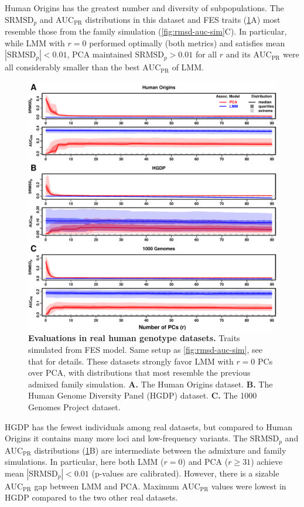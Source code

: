 \documentclass[11pt]{article}
\newcommand{\rmsd}{\text{SRMSD}_p}
\newcommand{\auc}{\text{AUC}_\text{PR}}
\begin{document}
Human Origins has the greatest number and diversity of subpopulations.
The $\rmsd$ and $\auc$ distributions in this dataset and FES traits (\cref{fig:rmsd-auc-real}A) most resemble those from the family simulation (\cref{fig:rmsd-auc-sim}C).
In particular, while LMM with $r=0$ performed optimally (both metrics) and satisfies mean $|\rmsd| < 0.01$, PCA maintained $\rmsd > 0.01$ for all $r$ and its $\auc$ were all considerably smaller than the best $\auc$ of LMM.

\begin{figure}[bp!]
  \centering
  \includegraphics[width=\textwidth,height=\textheight,keepaspectratio]{fes/rmsd-auc-real.pdf}
  \caption{
    {\small 
      {\bf Evaluations in real human genotype datasets.}
      Traits simulated from FES model.
      Same setup as \cref{fig:rmsd-auc-sim}, see that for details.
      These datasets strongly favor LMM with $r = 0$ PCs over PCA, with distributions that most resemble the previous admixed family simulation.
      \textbf{A.}
      The Human Origins dataset.
      \textbf{B.}
      The Human Genome Diversity Panel (HGDP) dataset.
      \textbf{C.}
      The 1000 Genomes Project dataset.
    }
  }
  \label{fig:rmsd-auc-real}
\end{figure}

HGDP has the fewest individuals among real datasets, but compared to Human Origins it contains many more loci and low-frequency variants.
The $\rmsd$ and $\auc$ distributions (\cref{fig:rmsd-auc-real}B) are intermediate between the admixture and family simulations.
In particular, here both LMM ($r=0$) and PCA ($r \ge 31$) achieve mean $|\rmsd| < 0.01$ (p-values are calibrated).
However, there is a sizable $\auc$ gap between LMM and PCA.
Maximum $\auc$ values were lowest in HGDP compared to the two other real datasets.
\end{document}
